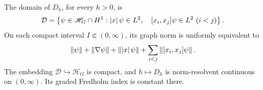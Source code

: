 \begin{samepage}
\begin{lemma}
\label{mass:common-domain}
The domain of \(D_h\), for every \(h>0\), is
\begin{equation}
\label{mass:graph-domain}
 \mathcal D=
 \left\{\psi\in\mathscr H_G\cap H^1:
  \abs{x}\psi\in L^2,\quad [x_i,x_j]\psi\in L^2\ (i<j)\right\}.
\end{equation}
On each compact interval \(I\Subset(0,\infty)\), its graph norm is
uniformly equivalent to
\begin{equation}
\label{mass:graph-norm}
 \left\lVert \psi\right\rVert+\left\lVert \nabla\psi\right\rVert+\left\lVert \left\lvert x\right\rvert\psi\right\rVert
       +\sum_{i<j}\left\lVert [x_i,x_j]\psi\right\rVert.
\end{equation}
The embedding \(\mathcal D\hookrightarrow\mathscr H_G\) is compact,
and \(h\mapsto D_h\) is norm-resolvent continuous on \((0,\infty)\).
Its graded Fredholm index is constant there.
\end{lemma}
\end{samepage}

